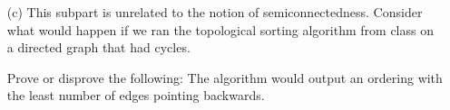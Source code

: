 \documentclass{article}
\begin{document}
\begin{itemize}
\begin{proof}
            This means that there exists a $j$ such that $x_{j}$ is before $x_{j - 1}$ in our topological ordering. But this is impossible and not a valid ordering because $x_{j - 1}$ must go before $x_{j}$.
        \end{proof}

    \item [(c)] This subpart is unrelated to the notion of semiconnectedness. Consider what would happen if we ran the topological sorting algorithm from class on a directed graph that had cycles.

    Prove or disprove the following: The algorithm would output an ordering with the least number of edges pointing backwards.
\end{itemize}
\end{document}
